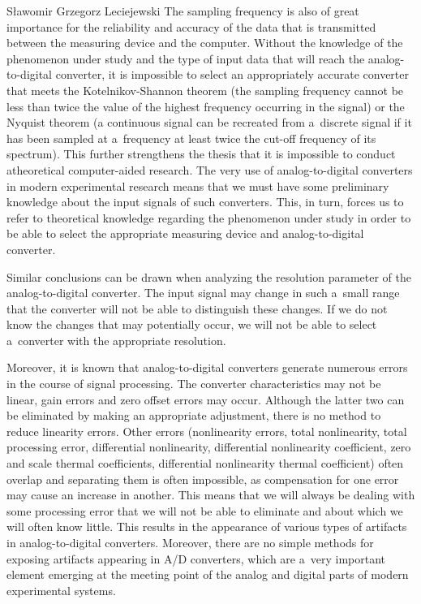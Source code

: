 \begin{artengenv}{Sławomir Grzegorz Leciejewski}
The sampling frequency is also of great importance for the reliability and accuracy of the data that is transmitted between the measuring device and the computer. Without the knowledge of the phenomenon under study and the type of input data that will reach the analog-to-digital converter, it is impossible to select an appropriately accurate converter that meets the Kotelnikov-Shannon theorem (the sampling frequency cannot be less than twice the value of the highest frequency occurring in the signal) or the Nyquist theorem (a continuous signal can be recreated from a~discrete signal if it has been sampled at a~frequency at least twice the cut-off frequency of its spectrum). This further strengthens the thesis that it is impossible to conduct atheoretical computer-aided research. The very use of analog-to-digital converters in modern experimental research means that we must have some preliminary knowledge about the input signals of such converters. This, in turn, forces us to refer to theoretical knowledge regarding the phenomenon under study in order to be able to select the appropriate measuring device and analog-to-digital converter.



Similar conclusions can be drawn when analyzing the resolution parameter of the analog-to-digital converter. The input signal may change in such a~small range that the converter will not be able to distinguish these changes. If we do not know the changes that may potentially occur, we will not be able to select a~converter with the appropriate resolution.



Moreover, it is known that analog-to-digital converters generate numerous errors in the course of signal processing. The converter characteristics may not be linear, gain errors and zero offset errors may occur. Although the latter two can be eliminated by making an appropriate adjustment, there is no method to reduce linearity errors. Other errors (nonlinearity errors, total nonlinearity, total processing error, differential nonlinearity, differential nonlinearity coefficient, zero and scale thermal coefficients, differential nonlinearity thermal coefficient) often overlap and separating them is often impossible, as compensation for one error may cause an increase in another. This means that we will always be dealing with some processing error that we will not be able to eliminate and about which we will often know little. This results in the appearance of various types of artifacts in analog-to-digital converters. Moreover, there are no simple methods for exposing artifacts appearing in A/D converters, which are a~very important element emerging at the meeting point of the analog and digital parts of modern experimental systems.


\end{artengenv}
